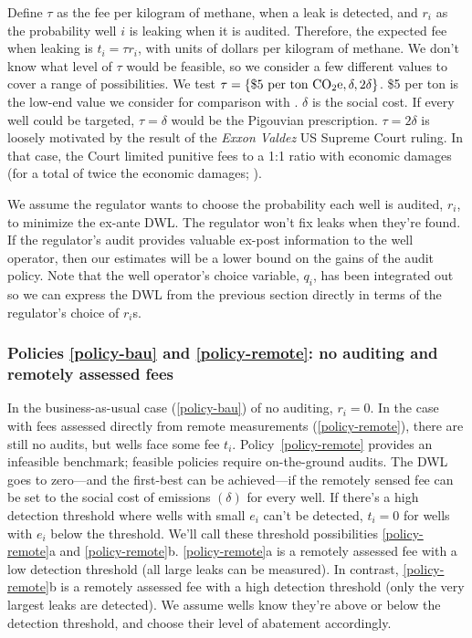 \documentclass[12pt,oneside,letterpaper]{article}
\theoremstyle{definition}
\begin{document}
\begin{refsection}
Define \(\tau\) as the fee per kilogram of methane, when a leak is detected, and
\(r_i\) as the probability well \(i\) is leaking when it is audited.
Therefore, the expected fee when leaking is \(t_i = \tau r_i \), with units of dollars per kilogram of methane.
We don't know what level of \(\tau\) would be feasible, so we consider a few different values to cover a range of possibilities.
We test
\(\tau = \{\text{\$5 per ton \ce{CO2e}}, \delta, 2 \delta\}\).
\$5 per ton  is the low-end value we consider for comparison with \textcite{Marks:2021}.
\(\delta\) is the social cost.
If every well could be targeted, \(\tau = \delta\) would be the Pigouvian prescription.
\(\tau = 2 \delta\) is loosely motivated by the result of the \textit{Exxon Valdez} US Supreme Court ruling.
In that case, the Court limited punitive fees to a 1:1 ratio with economic damages (for a total of twice the economic damages; \cite{exxon_v_baker:2008}).

We assume the regulator wants to choose the probability each well is audited, \(r_i\),
to minimize the ex-ante \gls{DWL}.
The regulator won't fix leaks when they're found.
If the regulator's audit provides valuable ex-post information to the well operator, then our estimates will be a lower bound on the gains of the audit policy.
Note that the well operator's choice variable, \(q_i\), has been integrated out so we can express the \gls{DWL} from the previous section directly in terms of the regulator's choice of \(r_i\)s.

\subsubsection{Policies \ref{policy-bau} and \ref{policy-remote}: no auditing and remotely assessed fees}
In the business-as-usual case (\ref{policy-bau}) of no auditing, \(r_i = 0\).
In the case with fees assessed directly from remote measurements (\ref{policy-remote}), there are still no audits, but wells face some fee \(t_i\).
Policy~\ref{policy-remote} provides an infeasible benchmark; feasible policies require on-the-ground audits.
The \gls{DWL} goes to zero---and the first-best can be achieved---if the remotely sensed fee can be set to the social cost of emissions \((\delta)\) for every well.
If there's a high detection threshold where wells with small \(e_i\) can't be detected, \(t_i = 0\) for wells with \(e_i\) below the threshold.
We'll call these threshold possibilities \ref{policy-remote}a and \ref{policy-remote}b.
\ref{policy-remote}a is a remotely assessed fee with a low detection threshold (all large leaks can be measured).
In contrast, \ref{policy-remote}b is a remotely assessed fee with a high detection threshold (only the very largest leaks are detected).
We assume wells know they're above or below the detection threshold, and choose their level of abatement accordingly.


\end{refsection}
\end{document}
